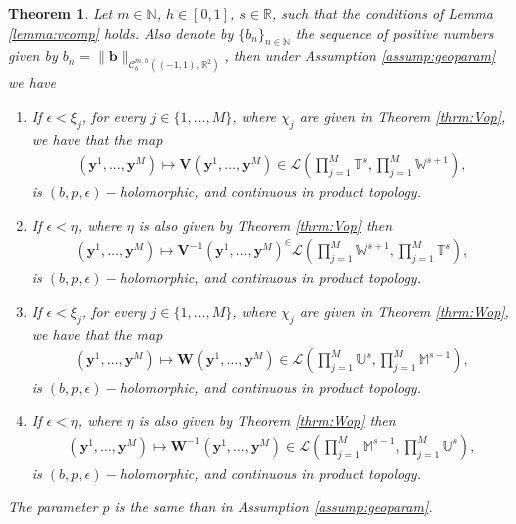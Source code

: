 \documentclass{article}
\newtheorem{theorem}{Theorem}[section]
\newcommand{\IN}{{\mathbb N}}
\newcommand{\IM}{{\mathbb M}}
\newcommand{\IR}{{\mathbb R}}
\newcommand{\IU}{{\mathbb U}}
\newcommand{\IT}{{\mathbb T}}
\newcommand{\IW}{{\mathbb W}}
\newcommand{\rgeoh}[2]{\mathcal{C}_b^{#1,#2}\left( (-1,1), \IR^2 \right)}
\newcommand{\by}{\bm{y}}
\newcommand{\bb}{\bm{b}}
\begin{document}
\begin{theorem}
\label{thrm:bepholm}
Let $m \in \IN$, $h \in [0,1]$, $s \in \IR$, such that the conditions of Lemma \ref{lemma:vcomp} holds. Also denote by $\{b_n\}_{n\in \IN}$ the sequence of positive numbers given by $b_n = \| \bb \|_{\rgeoh{m}{h}}$, then under Assumption \ref{assump:geoparam} we have 
\begin{enumerate}
\item 
If $\epsilon < \xi_j$, for every $j \in \{1,\hdots,M\}$, where $\chi_j$ are given in Theorem \ref{thrm:Vop}, we have that the map 
\begin{align*}
(\by^1,\hdots, \by^M ) \mapsto \mathbf{V}(\by^1,\hdots,\by^M) \in \mathcal{L}\left(\prod_{j=1}^M \IT^s, \prod_{j=1}^M \IW^{s+1}\right), 
\end{align*}
is $(b,p,\epsilon)-$holomorphic, and continuous in product topology. 
\item 
If $\epsilon < \eta$, where $\eta$ is also given by Theorem \ref{thrm:Vop} then 
\begin{align*}
(\by^1,\hdots, \by^M ) \mapsto \mathbf{V}^{-1}(\by^1,\hdots,\by^M)^ \in \mathcal{L}\left(\prod_{j=1}^M \IW^{s+1}, \prod_{j=1}^M \IT^{s}\right), 
\end{align*}
is $(b,p,\epsilon)-$holomorphic, and continuous in product topology. 
\item 
If $\epsilon < \xi_j$, for every $j \in \{1,\hdots,M\}$, where $\chi_j$ are given in Theorem \ref{thrm:Wop}, we have that the map 
\begin{align*}
(\by^1,\hdots, \by^M ) \mapsto \mathbf{W}(\by^1,\hdots,\by^M) \in \mathcal{L}\left(\prod_{j=1}^M \IU^s, \prod_{j=1}^M \IM^{s-1}\right), 
\end{align*}
is $(b,p,\epsilon)-$holomorphic, and continuous in product topology. 
\item 
If $\epsilon < \eta$, where $\eta$ is also given by Theorem \ref{thrm:Wop} then 
\begin{align*}
(\by^1,\hdots, \by^M ) \mapsto \mathbf{W}^{-1}(\by^1,\hdots,\by^M) \in \mathcal{L}\left(\prod_{j=1}^M \IM^{s-1}, \prod_{j=1}^M \IU^{s}\right), 
\end{align*}
is $(b,p,\epsilon)-$holomorphic, and continuous in product topology. 
\end{enumerate}
The parameter $p$ is the same than in Assumption \ref{assump:geoparam}. 
\end{theorem} 
\end{document}

